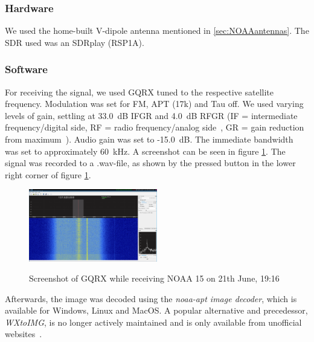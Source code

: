 \documentclass[conference]{IEEEtran}
\begin{document}
\subsubsection{Hardware}
We used the home-built V-dipole antenna mentioned in \ref{sec:NOAAantennas}. The SDR used was an SDRplay (RSP1A). 
\subsubsection{Software}
For receiving the signal, we used GQRX tuned to the respective satellite frequency. Modulation was set for FM, APT (17k) and Tau off. We used varying levels of gain, settling at 33.0~dB IFGR and 4.0~dB RFGR (IF = intermediate frequency/digital side, RF = radio frequency/analog side~\cite{analog07rfif}, GR = gain reduction from maximum~\cite{github18gainreduction}). Audio gain was set to -15.0~dB. The immediate bandwidth was set to approximately 60~kHz. A screenshot can be seen in figure \ref{fig:gqrx_noaa15}. The signal was recorded to a .wav-file, as shown by the pressed button in the lower right corner of figure \ref{fig:gqrx_noaa15}.\\
\begin{figure}
	\centering
	\caption{Screenshot of GQRX while receiving NOAA 15 on 21th June, 19:16}
	\includegraphics[width=0.5\textwidth]{gqrx_screenshot_noaa15} \label{fig:gqrx_noaa15}
\end{figure}
Afterwards, the image was decoded using the \textit{noaa-apt image decoder}, which is available for Windows, Linux and MacOS. A popular alternative and precedessor, \textit{WXtoIMG}, is no longer actively maintained and is only available from unofficial websites~\cite{bernardi19noaa-apt}. 
\end{document}
